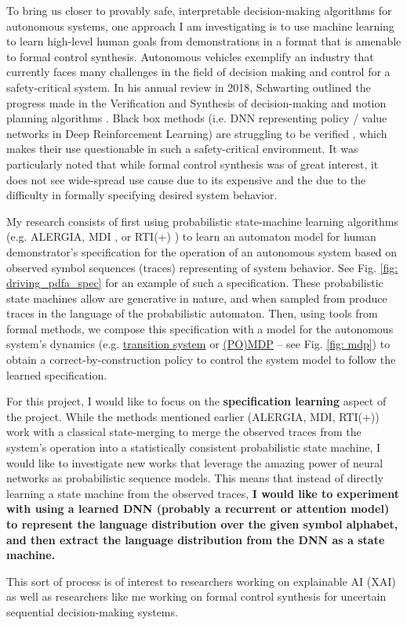 To bring us closer to provably safe, interpretable decision-making algorithms for autonomous systems, one approach I am investigating is to use machine learning to learn high-level human goals from demonstrations in a format that is amenable to formal control synthesis. Autonomous vehicles exemplify an industry that currently faces many challenges in the field of decision making and control for a safety-critical system. In his annual review in 2018, Schwarting outlined the progress made in the Verification and Synthesis of decision-making and motion planning algorithms \cite{doi:10.1146/annurev-control-060117-105157}. Black box methods (i.e. DNN representing policy / value networks in Deep Reinforcement Learning) are struggling to be verified \cite{doi:10.1146/annurev-control-060117-105157}, which makes their use questionable in such a safety-critical environment. It was particularly noted that while formal control synthesis was of great interest, it does not see wide-spread use cause due to its expensive and the due to the difficulty in formally specifying desired system behavior.

My research consists of first using probabilistic state-machine learning algorithms (e.g. ALERGIA, MDI \cite{prob_state_merging_book}, or RTI(+) \cite{Verwer_PAutomaC}) to learn an automaton model for human demonstrator's specification for the operation of an autonomous system based on observed symbol sequences (traces) representing of system behavior. See Fig. \ref{fig: driving_pdfa_spec} for an example of such a specification. These probabilistic state machines allow are generative in nature, and when sampled from produce traces in the language of the probabilistic automaton. Then, using tools from formal methods, we compose this specification with a model for the autonomous system's dynamics (e.g. \href{https://en.wikipedia.org/wiki/Transition_system}{transition system} or \href{https://en.wikipedia.org/wiki/Markov_decision_process}{(PO)MDP} -- see Fig. \ref{fig: mdp}) to obtain a correct-by-construction policy to control the system model to follow the learned specification.

For this project, I would like to focus on the \textbf{specification learning} aspect of the project. While the methods mentioned earlier (ALERGIA, MDI, RTI(+)) work with a classical state-merging to merge the observed traces from the system's operation into a statistically consistent probabilistic state machine, I would like to investigate new works that leverage the amazing power of neural networks as probabilistic sequence models. This means that instead of directly learning a state machine from the observed traces, \textbf{I would like to experiment with using a learned DNN (probably a recurrent or attention model) to represent the language distribution over the given symbol alphabet, and then extract the language distribution from the DNN as a state machine.}

This sort of process is of interest to researchers working on explainable AI (XAI) as well as researchers like me working on formal control synthesis for uncertain sequential decision-making systems.